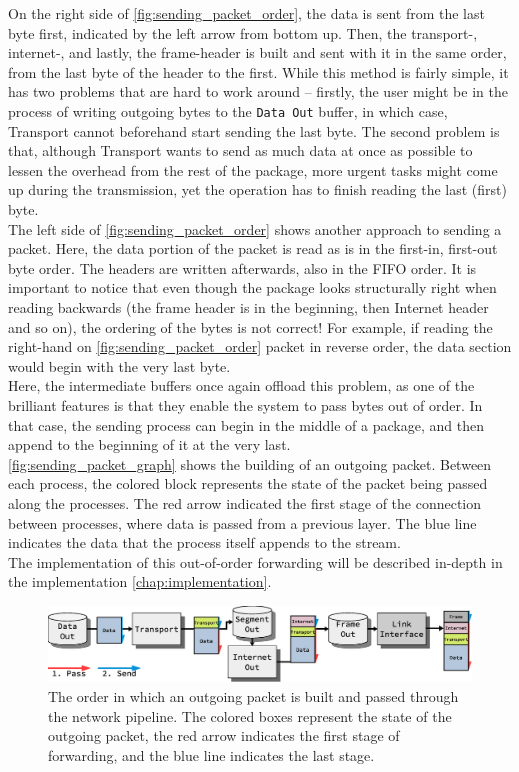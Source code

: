 On the right side of \autoref{fig:sending_packet_order}, the data is sent
from the last byte first, indicated by the left arrow from bottom
up. Then, the
transport-, internet-, and lastly, the frame-header is built and sent with it
in the same order, from the last byte of the header to the first.
While this method is fairly simple, it has two problems that are hard to work
around -- firstly, the user might be in the process of writing outgoing bytes
to the \texttt{Data Out} buffer, in which case, Transport cannot beforehand
start sending the last byte. The second problem is that, although Transport
wants to send as much data at once as possible to lessen the overhead from the
rest of the package, more urgent tasks might come up during the transmission,
yet the operation has to finish reading the last (first) byte.\\
The left side of \autoref{fig:sending_packet_order} shows another approach
to sending a packet. Here, the data portion of the packet is read as is in the
first-in, first-out byte order. The headers are written afterwards, also in the
FIFO order. It is important to notice that even though the package looks
structurally right when reading backwards (the frame header is in the beginning,
then Internet header and so on), the ordering of the bytes is not correct! For
example, if reading the right-hand on \autoref{fig:sending_packet_order}
packet in reverse order, the data section would begin with the very last byte.
\\
Here, the intermediate buffers once again offload this problem, as one of the
brilliant features is that they enable the system to pass bytes out of order.
In that case, the sending process can begin in the middle of a package, and then
append to the beginning of it at the very last.\\
\autoref{fig:sending_packet_graph} shows the building of an outgoing packet.
Between each process, the colored block represents the state of the packet
being passed along the processes. The red arrow indicated the first stage of
the connection between processes, where data is passed from a previous layer.
The blue line indicates the data that the process itself appends to the stream.\\
The implementation of this out-of-order forwarding will be described in-depth
in the implementation \autoref{chap:implementation}.

\begin{figure}
    \centering
    \includegraphics[width=\linewidth]{design/sending_packet_graph.eps}
    \caption{The order in which an outgoing packet is built and passed through the network pipeline.
    The colored boxes represent the state of the outgoing packet, the red arrow
    indicates the first stage of forwarding, and the blue line indicates the last stage.}
    \label{fig:sending_packet_graph}
\end{figure}




